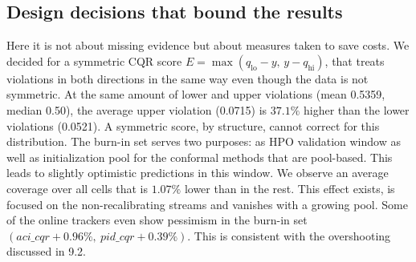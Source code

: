 \subsection{Design decisions that bound the results}
\label{sec:lim:design}
Here it is not about missing evidence but about measures taken to save costs.
We decided for a symmetric CQR score $E = \max(q_{\text{lo}} - y, \, y - q_{\text{hi}})$, that treats violations in both directions in the same way even though the data is not symmetric. At the same amount of lower and upper violations (mean 0.5359, median 0.50), the average upper violation (0.0715) is $37.1\%$ higher than the lower violations (0.0521). A symmetric score, by structure, cannot correct for this distribution.
%
%
The burn-in set serves two purposes: as HPO validation window as well as initialization pool for the conformal methods that are pool-based. This leads to slightly optimistic predictions in this window. We observe an average coverage over all cells that is $1.07\%$ lower than in the rest. This effect exists, is focused on the non-recalibrating streams and vanishes with a growing pool. Some of the online trackers even show pessimism in the burn-in set $(aci\_cqr +0.96\%,\ pid\_cqr +0.39\%)$. This is consistent with the overshooting discussed in 9.2.
